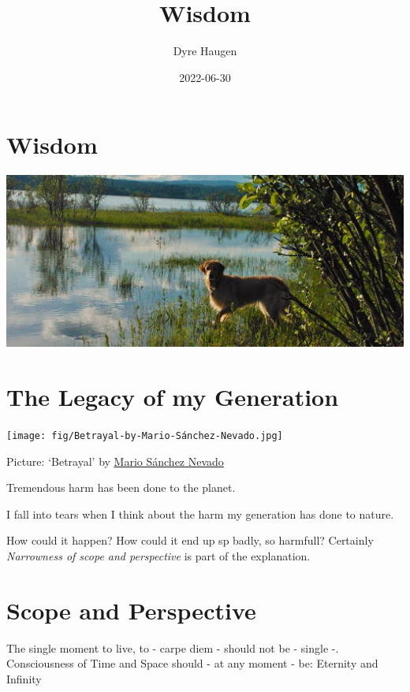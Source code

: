 \documentclass[
]{book}
\title{Wisdom}
\author{Dyre Haugen}
\date{2022-06-30}
\begin{document}
\maketitle

{
\setcounter{tocdepth}{1}
\tableofcontents
}
\hypertarget{wisdom}{%
\chapter{Wisdom}\label{wisdom}}

\includegraphics{fig/zelda.jpg}

\hypertarget{the-legacy-of-my-generation}{%
\chapter{The Legacy of my Generation}\label{the-legacy-of-my-generation}}

\texttt{[image: fig/Betrayal-by-Mario-Sánchez-Nevado.jpg]}

Picture: `Betrayal' by \href{https://mario-sanchez-nevado.pixels.com/featured/betrayal-mario-sanchez-n\%20evado.html}{Mario Sánchez Nevado}

Tremendous harm has been done to the planet.

I fall into tears when I think about the harm my generation has done to nature.

How could it happen? How could it end up sp badly, so harmfull?
Certainly \emph{Narrowness of scope and perspective} is part of the explanation.

\hypertarget{scope-and-perspective}{%
\chapter{Scope and Perspective}\label{scope-and-perspective}}

The single moment to live, to - carpe diem - should not be - single -.\\
Consciousness of Time and Space should - at any moment - be: Eternity and Infinity
\end{document}
